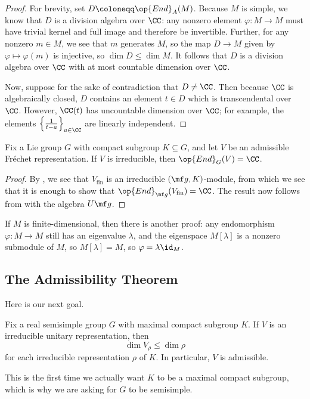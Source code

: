 \documentclass[../notes.tex]{subfiles}
\begin{document}
\begin{proof}
	For brevity, set $D\coloneqq\op{End}_A(M)$. Because $M$ is simple, we know that $D$ is a division algebra over $\CC$: any nonzero element $\varphi\colon M\to M$ must have trivial kernel and full image and therefore be invertible. Further, for any nonzero $m\in M$, we see that $m$ generates $M$, so the map $D\to M$ given by $\varphi\mapsto\varphi(m)$ is injective, so $\dim D\le\dim M$. It follows that $D$ is a division algebra over $\CC$ with at most countable dimension over $\CC$.

	Now, suppose for the sake of contradiction that $D\ne\CC$. Then because $\CC$ is algebraically closed, $D$ contains an element $t\in D$ which is transcendental over $\CC$. However, $\CC(t)$ has uncountable dimension over $\CC$; for example, the elements $\left\{\frac1{t-a}\right\}_{a\in\CC}$ are linearly independent.
\end{proof}
\begin{corollary}
	Fix a Lie group $G$ with compact subgroup $K\subseteq G$, and let $V$ be an admissible Fr\'echet representation. If $V$ is irreducible, then $\op{End}_G(V)=\CC$.
\end{corollary}
\begin{proof}
	By , we see that $V_{\mathrm{fin}}$ is an irreducible $(\mf g,K)$-module, from which we see that it is enough to show that $\op{End}_{\mf g}(V_{\mathrm{fin}})=\CC$. The result now follows from  with the algebra $U\mf g$.
\end{proof}
\begin{remark}
	If $M$ is finite-dimensional, then there is another proof: any endomorphism $\varphi\colon M\to M$ still has an eigenvalue $\lambda$, and the eigenspace $M[\lambda]$ is a nonzero submodule of $M$, so $M[\lambda]=M$, so $\varphi=\lambda\id_M$.
\end{remark}

\subsection{The Admissibility Theorem}
Here is our next goal.
\begin{theorem}
	Fix a real semisimple group $G$ with maximal compact subgroup $K$. If $V$ is an irreducible unitary representation, then
	\[\dim V_\rho\le\dim\rho\]
	for each irreducible representation $\rho$ of $K$. In particular, $V$ is admissible.
\end{theorem}
This is the first time we actually want $K$ to be a maximal compact subgroup, which is why we are asking for $G$ to be semisimple.
\end{document}
